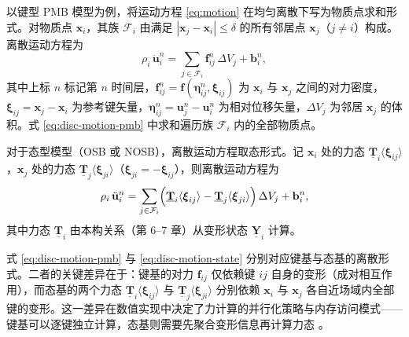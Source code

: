 以键型 PMB 模型为例，将运动方程 \eqref{eq:motion} 在均匀离散下写为物质点求和形式。对物质点 $\mathbf{x}_i$，其族 $\mathcal{F}_i$ 由满足 $|\mathbf{x}_j-\mathbf{x}_i|\le\delta$ 的所有邻居点 $\mathbf{x}_j$（$j\neq i$）构成。离散运动方程为
\begin{equation}
  \rho_i\,\ddot{\mathbf{u}}_i^{n}
  =\sum_{j\in\mathcal{F}_i}\mathbf{f}_{ij}^{n}\,\Delta V_j
  +\mathbf{b}_i^{n},
  \label{eq:disc-motion-pmb}
\end{equation}
其中上标 $n$ 标记第 $n$ 时间层，$\mathbf{f}_{ij}^{n}=\mathbf{f}(\boldsymbol{\eta}_{ij}^{n},\boldsymbol{\xi}_{ij})$ 为 $\mathbf{x}_i$ 与 $\mathbf{x}_j$ 之间的对力密度，$\boldsymbol{\xi}_{ij}=\mathbf{x}_j-\mathbf{x}_i$ 为参考键矢量，$\boldsymbol{\eta}_{ij}^{n}=\mathbf{u}_j^{n}-\mathbf{u}_i^{n}$ 为相对位移矢量，$\Delta V_j$ 为邻居 $\mathbf{x}_j$ 的体积。式 \eqref{eq:disc-motion-pmb} 中求和遍历族 $\mathcal{F}_i$ 内的全部物质点。

对于态型模型（OSB 或 NOSB），离散运动方程取态形式。记 $\mathbf{x}_i$ 处的力态 $\underline{\mathbf{T}}_i\langle\boldsymbol{\xi}_{ij}\rangle$，$\mathbf{x}_j$ 处的力态 $\underline{\mathbf{T}}_j\langle\boldsymbol{\xi}_{ji}\rangle$（$\boldsymbol{\xi}_{ji}=-\boldsymbol{\xi}_{ij}$），则离散运动方程为
\begin{equation}
  \rho_i\,\ddot{\mathbf{u}}_i^{n}
  =\sum_{j\in\mathcal{F}_i}\Bigl(
  \underline{\mathbf{T}}_i\langle\boldsymbol{\xi}_{ij}\rangle
  -\underline{\mathbf{T}}_j\langle\boldsymbol{\xi}_{ji}\rangle
  \Bigr)\,\Delta V_j
  +\mathbf{b}_i^{n},
  \label{eq:disc-motion-state}
\end{equation}
其中力态 $\underline{\mathbf{T}}_i$ 由本构关系（第 6--7 章）从变形状态 $\underline{\mathbf{Y}}_i$ 计算。

\begin{remark}
  式 \eqref{eq:disc-motion-pmb} 与 \eqref{eq:disc-motion-state} 分别对应键基与态基的离散形式。二者的关键差异在于：键基的对力 $\mathbf{f}_{ij}$ 仅依赖键 $ij$ 自身的变形（成对相互作用），而态基的两个力态 $\underline{\mathbf{T}}_i\langle\boldsymbol{\xi}_{ij}\rangle$ 与 $\underline{\mathbf{T}}_j\langle\boldsymbol{\xi}_{ji}\rangle$ 分别依赖 $\mathbf{x}_i$ 与 $\mathbf{x}_j$ 各自近场域内全部键的变形。这一差异在数值实现中决定了力计算的并行化策略与内存访问模式——键基可以逐键独立计算，态基则需要先聚合变形信息再计算力态 \cite{Parks2008,SillingAskari2005}。
\end{remark}

